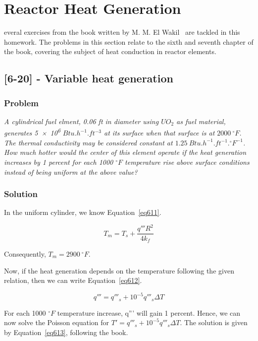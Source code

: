 %
%
\let\textcircled=\pgftextcircled
\chapter{Reactor Heat Generation}
\label{chap:intro}

everal exercises from the book written by M. M. El Wakil~\cite{book01} are tackled in this homework. The problems in this section relate to the sixth and seventh chapter of the book, covering the subject of heat conduction in reactor elements.

\section{[6-20] - Variable heat generation}
\label{prob51}

\subsection{Problem}
\textit{A cylindrical fuel elment, 0.06 ft in diameter using $UO_2$ as fuel material, generates \num{5e6} $Btu.h^{-1}.ft^{-3}$ at its surface when that surface is at $2000\ {}^\circ F$. The thermal conductivity may be considered constant at $1.25\ Btu.h^{-1}.ft^{-1}.{}^\circ F^{-1}$. How much hotter would the center of this element operate if the heat generation increases by 1 percent for each 1000 ${}^\circ F$ temperature rise above surface conditions instead of being uniform at the above value?}

\subsection{Solution}

In the uniform cylinder, we know Equation~\ref{eq611}.

\begin{equation}\label{eq611}
T_m = T_s + \frac{q'''R^2}{4k_f}
\end{equation}

Consequently, $T_m = 2900\ {}^\circ F$.

Now, if the heat generation depends on the temperature following the given relation, then we can write Equation~\ref{eq612}.

\begin{equation}\label{eq612}
q''' = q'''_s + 10^{-5}q'''_s\Delta T
\end{equation}

For each 1000 ${}^\circ F$ temperature increase, q''' will gain 1 percent. Hence, we can now solve the Poisson equation for $T' = q'''_s + 10^{-5}q'''_s\Delta T$. The solution is given by Equation~\ref{eq613}, following the book.


